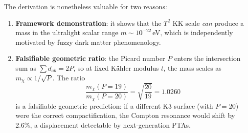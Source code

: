 \noindent The derivation is nonetheless valuable for two reasons:
\begin{enumerate}
    \item \textbf{Framework demonstration}: it shows that the $T^2$ KK scale \emph{can} produce a mass in the ultralight scalar range $m \sim 10^{-22}\,$eV, which is independently motivated by fuzzy dark matter phenomenology.
    \item \textbf{Falsifiable geometric ratio}: the Picard number $P$ enters the intersection sum as $\sum d_{ab} = 2P$, so at fixed K\"ahler modulus $t$, the mass scales as $m_\chi \propto 1/\sqrt{P}$.  The ratio
    \begin{equation}
        \frac{m_\chi(P=19)}{m_\chi(P=20)} = \sqrt{\frac{20}{19}} = 1.0260
        \label{eq:picard_ratio}
    \end{equation}
    is a falsifiable geometric prediction: if a different K3 surface (with $P = 20$) were the correct compactification, the Compton resonance would shift by $2.6\%$, a displacement detectable by next-generation PTAs.
\end{enumerate}
